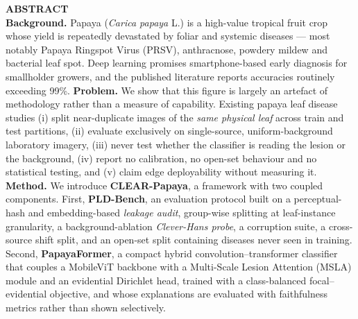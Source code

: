 \documentclass[10pt,twocolumn,a4paper]{article}
\begin{document}
\begin{@twocolumnfalse}
\begin{center}
\setlength{\fboxsep}{8pt}
\noindent\colorbox{boxbg}{\parbox{0.96\textwidth}{\small
\textbf{ABSTRACT}\\[3pt]
\textbf{Background.} Papaya (\textit{Carica papaya} L.) is a high-value tropical fruit crop whose yield is repeatedly devastated by foliar and systemic diseases --- most notably Papaya Ringspot Virus (PRSV), anthracnose, powdery mildew and bacterial leaf spot. Deep learning promises smartphone-based early diagnosis for smallholder growers, and the published literature reports accuracies routinely exceeding 99\%.
\textbf{Problem.} We show that this figure is largely an artefact of methodology rather than a measure of capability. Existing papaya leaf disease studies (i) split near-duplicate images of the \emph{same physical leaf} across train and test partitions, (ii) evaluate exclusively on single-source, uniform-background laboratory imagery, (iii) never test whether the classifier is reading the lesion or the background, (iv) report no calibration, no open-set behaviour and no statistical testing, and (v) claim edge deployability without measuring it.
\textbf{Method.} We introduce \textbf{CLEAR-Papaya}, a framework with two coupled components. First, \textbf{PLD-Bench}, an evaluation protocol built on a perceptual-hash and embedding-based \emph{leakage audit}, group-wise splitting at leaf-instance granularity, a background-ablation \emph{Clever-Hans probe}, a corruption suite, a cross-source shift split, and an open-set split containing diseases never seen in training. Second, \textbf{PapayaFormer}, a compact hybrid convolution--transformer classifier that couples a MobileViT backbone with a Multi-Scale Lesion Attention (MSLA) module and an evidential Dirichlet head, trained with a class-balanced focal--evidential objective, and whose explanations are evaluated with faithfulness metrics rather than shown selectively.
}}
\end{center}
\end{@twocolumnfalse}
\end{document}
